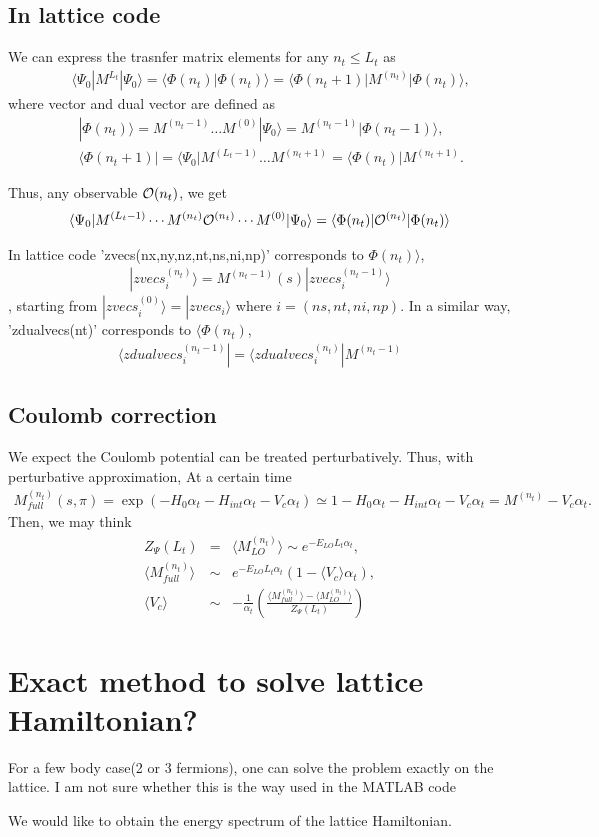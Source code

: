 \documentclass[10pt]{book}
\newcommand{\bea}{\begin{eqnarray}}
\newcommand{\eea}{\end{eqnarray}}
\newcommand{\no}{\nonumber \\}
\def\la{\langle}
\def\ra{\rangle}
\begin{document}
\subsection{In lattice code}
We can express the trasnfer matrix elements for any $n_t\leq L_t$ as   
\bea 
& &\la \Psi_0|M^{L_t}|\Psi_0\ra = \la \Phi(n_t)|\Phi(n_t)\ra
 =
 \la \Phi(n_t+1)| M^{(n_t)}  |\Phi(n_t)\ra,
\eea 
where vector and dual vector are defined as 
\bea  
& &|\Phi(n_t)\ra = M^{(n_t-1)} \dots M^{(0)}|\Psi_0\ra = M^{(n_t-1)}|\Phi(n_t-1)\ra ,\no 
& &\la \Phi(n_t+1)|=\la \Psi_0|M^{(L_t-1)}\dots M^{(n_t+1)} =\la \Phi(n_t)|M^{(n_t+1)}.
\eea 

Thus, any observable ${\cal O}(n_t)$, we get 
\bea 
\la \Psi_0| M^{(L_t-1)}\cdots M^{(n_t)} {\cal O}^{(n_t)} \cdots M^{(0)}|\Psi_0\ra 
 = \la \Phi(n_t)| {\cal O}^{(n_t)}|\Phi(n_t)\ra 
\eea 


In lattice code 'zvecs(nx,ny,nz,nt,ns,ni,np)' corresponds to $\Phi(n_t)\ra $,
\bea 
|zvecs^{(n_t)}_{i}\ra= M^{(n_t-1)}(s)|zvecs^{(n_t-1)}_{i}\ra
\eea , 
starting from $|zvecs^{(0)}_{i}\ra=|zvecs_{i}\ra$ 
where $i=(ns,nt,ni,np)$. 
In a similar way, 'zdualvecs(nt)' corresponds to $\la \Phi(n_t)$,
\bea 
\la zdualvecs^{(n_t-1)}_i|=\la zdualvecs^{(n_t)}_i| M^{(n_t-1)}
\eea 


\subsection{Coulomb correction}
We expect the Coulomb potential can be treated perturbatively. 
Thus, with perturbative approximation, At a certain time
\bea 
M^{(n_t)}_{full}(s,\pi)=\exp(-H_0\alpha_t-H_{int}\alpha_t-V_c\alpha_t)
\simeq 1-H_0\alpha_t -H_{int}\alpha_t -V_c\alpha_t = M^{(n_t)}-V_c\alpha_t.
\eea 
Then, we may think
\bea 
Z_{\Psi}(L_t) &=& \la M^{(n_t)}_{LO}\ra \sim  e^{-E_{LO} L_t \alpha_t},\no 
\la M^{(n_t)}_{full}\ra &\sim&  e^{-E_{LO} L_t \alpha_t}(1-\la V_c\ra \alpha_t),\no 
\la V_c\ra &\sim&  -\frac{1}{\alpha_t}\left(\frac{\la M^{(n_t)}_{full}\ra -\la M^{(n_t)}_{LO}\ra}{Z_\Psi(L_t)}\right)
\eea 

\section{Exact method to solve lattice Hamiltonian?} 
For a few body case(2 or 3 fermions), one can solve the problem exactly on the lattice. 
{\color{red} I am not sure whether this is the way used in the MATLAB code}

We would like to obtain the energy spectrum of the lattice Hamiltonian. 
\end{document}
